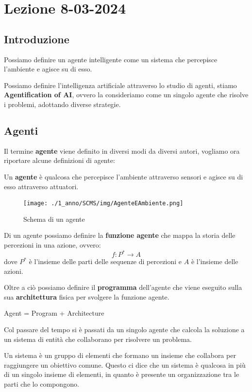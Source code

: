 \chapter{Lezione 8-03-2024}
\section{Introduzione}
\begin{definizione}
    Possiamo definire un agente intelligente come un sistema che percepisce
    l'ambiente e agisce su di esso.
\end{definizione}

Possiamo definire l'intelligenza artificiale attraverso lo studio di agenti,
stiamo \textbf{Agentification of AI}, ovvero la consideriamo come un singolo
agente che risolve i problemi, adottando diverse strategie.

\section{Agenti}
Il termine \textbf{agente} viene definito in diversi modi da diversi autori,
vogliamo ora riportare alcune definizioni di agente:
\begin{definizione}
    Un \textbf{agente} è qualcosa che percepisce l'ambiente attraverso sensori e
    agisce su di esso attraverso attuatori.
\end{definizione}
\begin{figure}
    \centering
    \texttt{[image: ./1\_anno/SCMS/img/AgenteEAmbiente.png]}
    \caption{Schema di un agente}
    \label{fig:agenti}
\end{figure}
Di un agente possiamo definire la \textbf{funzione agente} che mappa la storia
delle percezioni in una azione, ovvero:
\begin{equation}
    f: P^* \rightarrow A
\end{equation}
dove $P^*$ è l'insieme delle parti delle sequenze di percezioni e $A$ è l'insieme
delle azioni.

Oltre a ciò possiamo definire il \textbf{programma} dell'agente che viene
eseguito sulla sua \textbf{architettura} fisica per svolgere la funzione agente.
\begin{center}
    Agent = Program + Architecture
\end{center}

Col passare del tempo si è passati da un singolo agente che calcola la soluzione
a un sistema di entità che collaborano per risolvere un problema.
\begin{definizione}
    Un sistema è un gruppo di elementi che formano un insieme che collabora per
    raggiungere un obiettivo comune. Questo ci dice che un sistema è qualcosa in
    più di un singolo insieme di elementi, in quanto è presente un organizzazione
    tra le parti che lo compongono.
\end{definizione}

